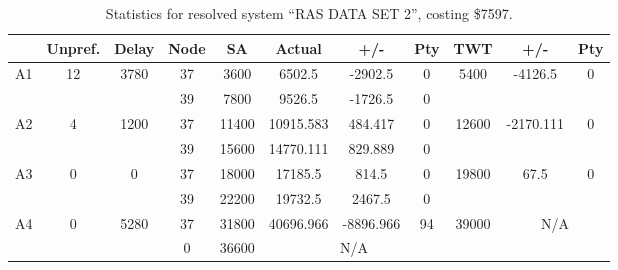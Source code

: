 \begin{sidewaystable}
\footnotesize
\centering
\caption{Statistics for resolved system ``RAS DATA SET 2'', costing \$7597.}
\begin{tabular}{c||c|c||c|c|c|c|c||c|c|c}
  \hline \hline
  &
  Unpref. & 
  Delay &
  Node &
  SA &
  Actual &
  +/- &
  Pty &
  TWT &
  +/- &
  Pty \\
      \hline
      \multirow{2}{*}{A1} &
      \multirow{2}{*}{12} &
      \multirow{2}{*}{3780} &
      37 &
      3600 &
        6502.5 &
        -2902.5 &
        0 &
      \multirow{2}{*}{5400} &
        \multirow{2}{*}{-4126.5} &
        \multirow{2}{*}{0}
      \\
      \cline{4-8}
       &
       &
       &
      39 &
      7800 &
        9526.5 &
        -1726.5 &
        0 &
      
         &
        
      \\
      \hline
      \multirow{2}{*}{A2} &
      \multirow{2}{*}{4} &
      \multirow{2}{*}{1200} &
      37 &
      11400 &
        10915.583 &
        484.417 &
        0 &
      \multirow{2}{*}{12600} &
        \multirow{2}{*}{-2170.111} &
        \multirow{2}{*}{0}
      \\
      \cline{4-8}
       &
       &
       &
      39 &
      15600 &
        14770.111 &
        829.889 &
        0 &
      
         &
        
      \\
      \hline
      \multirow{2}{*}{A3} &
      \multirow{2}{*}{0} &
      \multirow{2}{*}{0} &
      37 &
      18000 &
        17185.5 &
        814.5 &
        0 &
      \multirow{2}{*}{19800} &
        \multirow{2}{*}{67.5} &
        \multirow{2}{*}{0}
      \\
      \cline{4-8}
       &
       &
       &
      39 &
      22200 &
        19732.5 &
        2467.5 &
        0 &
      
         &
        
      \\
      \hline
      \multirow{2}{*}{A4} &
      \multirow{2}{*}{0} &
      \multirow{2}{*}{5280} &
      37 &
      31800 &
        40696.966 &
        -8896.966 &
        94 &
      \multirow{2}{*}{39000} &
        \multicolumn{2}{c}{\multirow{2}{*}{N/A}}
      \\
      \cline{4-8}
       &
       &
       &
      0 &
      36600 &
        \multicolumn{3}{|c||}{N/A} &
      

\end{tabular}
\end{sidewaystable}
